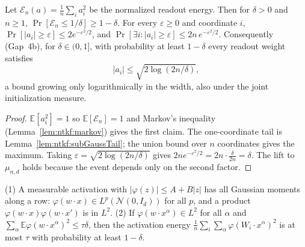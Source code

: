 \begin{lemma}\label{lem:ntkdeep:readoutTails}
  \leanok
Let $\mathcal E_n(a)=\frac1n\sum_ia_i^2$ be the normalized readout energy. Then for $\delta>0$ and $n\ge1$,
$\Pr[\mathcal E_n\le1/\delta]\ge1-\delta$. For every $\varepsilon\ge0$ and coordinate $i$, $\Pr[|a_i|\ge\varepsilon]\le2e^{-\varepsilon^2/2}$, and
$\Pr[\exists i:|a_i|\ge\varepsilon]\le2n\,e^{-\varepsilon^2/2}$. Consequently (Gap~4b), for $\delta\in(0,1]$, with probability at least $1-\delta$ every readout weight satisfies
\[
  |a_i|\le\sqrt{2\log(2n/\delta)},
\]
a bound growing only logarithmically in the width, also under the joint initialization measure.
\end{lemma}

\begin{proof}
  \leanok
$\mathbb E[a_i^2]=1$ so $\mathbb E[\mathcal E_n]=1$ and Markov's inequality (Lemma~\ref{lem:ntkf:markov}) gives the first claim. The one-coordinate tail is Lemma~\ref{lem:ntkf:subGaussTail}; the union bound over $n$ coordinates gives the maximum. Taking $\varepsilon=\sqrt{2\log(2n/\delta)}$ gives $2ne^{-\varepsilon^2/2}=2n\cdot\frac{\delta}{2n}=\delta$.
The lift to $\mu_{n,d}$ holds because the event depends only on the second factor.
\end{proof}

\begin{lemma}\label{lem:ntkdeep:activationMoments}
  \leanok
(1) A measurable activation with $|\varphi(z)|\le A+B|z|$ has all Gaussian moments along a row: $\varphi(w\cdot x)\in L^p(\mathcal N(0,I_d))$ for all $p$, and a product $\varphi(w\cdot x)\varphi(w\cdot x')$ is in $L^2$.
(2) If $\varphi(w\cdot x^\alpha)\in L^2$ for all $\alpha$ and $\sum_\alpha\mathbb E\varphi(w\cdot x^\alpha)^2\le\tau\delta$, then the activation energy $\frac1n\sum_i\sum_\alpha\varphi(W_i\cdot x^\alpha)^2$ is at most $\tau$ with probability at least $1-\delta$.
\end{lemma}

